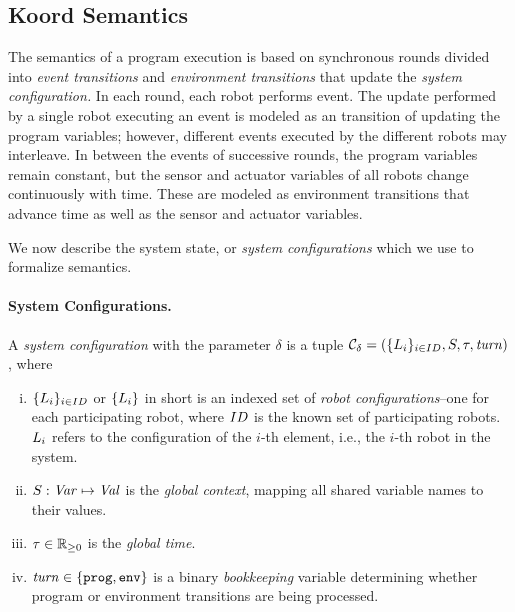 \subsection{Koord Semantics}
\label{sec:configs}

The semantics of a \lgname program execution is based on synchronous rounds divided into {\em event transitions\/} and {\em environment transitions\/} that update the {\em system configuration.\/}
In each round, each robot performs  event.
The update performed by a single robot executing an event is modeled as an transition of updating the program variables;
however, different events executed by the different robots may interleave.
In between the events of successive rounds, the program variables remain constant,
but the sensor and actuator variables of all robots change continuously with time.
These are modeled as environment transitions that advance time as well as the sensor and actuator variables.

We now describe the system state, or \emph{system configurations} which we use to formalize \lgname semantics.

\paragraph{System Configurations.}

%
%
A {\em system configuration\/} with the parameter $\delta$ is a tuple $\mathcal{C}_\delta = (\{L_{i}\}_{i\in ID},{S},\tau,\mathit{turn})$, where

\begin{enumerate}[(i)]
\item $\{L_{i}\}_{i\in ID}$ or $\{L_{i}\}$ in short is an indexed set of \emph{robot configurations}--one for each participating robot,
      where $ID$ is the known set of participating robots.
%    
      $L_{i}$ refers to the configuration of the $i$-th element, i.e., the $i$-th robot in the system.
\item ${S} : \mathit{Var} \mapsto \mathit{Val}$ is the {\em global context\/}, mapping all shared variable names to their values.
\item $\tau\in \nnreals$ is the {\em global time\/}.
\item $\mathit{turn}\in\{\mathtt{prog},\mathtt{env}\}$ is a binary \emph{bookkeeping} variable determining whether  program or environment transitions are being processed.
\end{enumerate}

